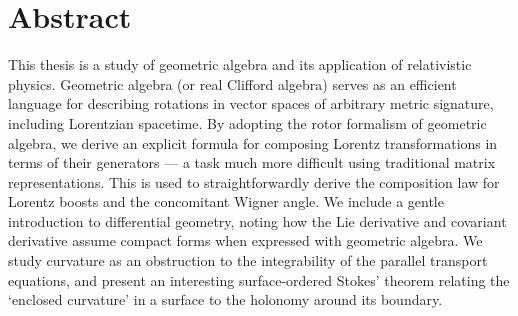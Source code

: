 \chapter*{Abstract}

This thesis is a study of geometric algebra and its application of relativistic physics.
Geometric algebra (or real Clifford algebra) serves as an efficient language for describing rotations in vector spaces of arbitrary metric signature, including Lorentzian spacetime.
By adopting the rotor formalism of geometric algebra, we derive an explicit  formula for composing Lorentz transformations in terms of their generators --- a task much more difficult using traditional matrix representations.
This is used to straightforwardly derive the composition law for Lorentz boosts and the concomitant Wigner angle.
We include a gentle introduction to differential geometry, noting how the Lie derivative and covariant derivative assume compact forms when expressed with geometric algebra.
We study curvature as an obstruction to the integrability of the parallel transport equations, and present an interesting surface-ordered Stokes' theorem relating the `enclosed curvature' in a surface to the holonomy around its boundary.